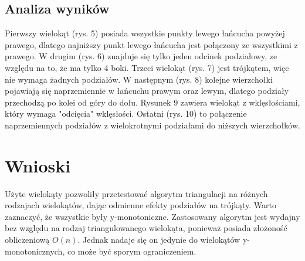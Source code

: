 \documentclass[11pt]{scrartcl}
\begin{document}
    \subsection{Analiza wyników}
    Pierwszy wielokąt (rys. 5) posiada wszystkie punkty lewego łańcucha powyżej
    prawego, dlatego najniższy punkt lewego łańcucha jest połączony ze wszystkimi
    z prawego. W drugim (rys. 6) znajduje się tylko jeden odcinek podziałowy, ze względu na
    to, że ma tylko 4 boki. Trzeci wielokąt (rys. 7) jest trójkątem, więc nie wymaga
    żadnych podziałów. W następnym (rys. 8) kolejne wierzchołki pojawiają się naprzemiennie
    w łańcuchu prawym oraz lewym, dlatego podziały przechodzą po kolei od góry do dołu.
    Rysunek 9 zawiera wielokąt z wklęsłościami, który wymaga "odcięcia" wklęsłości.
    Ostatni (rys. 10) to połączenie naprzemiennych podziałów z wielokrotnymi podziałami
    do niższych wierzchołków.

    \section{Wnioski}
    Użyte wielokąty pozwoliły przetestować algorytm triangulacji na różnych rodzajach
    wielokątów, dając odmienne efekty podziałów na trójkąty. Warto zaznaczyć, że wszystkie
    były y-monotoniczne. Zastosowany algorytm jest wydajny bez względu na rodzaj
    triangulowanego wielokąta, ponieważ posiada złożoność obliczeniową $O(n)$. Jednak
    nadaje się on jedynie do wielokątów y-monotonicznych, co może być sporym ograniczeniem.
\end{document}
